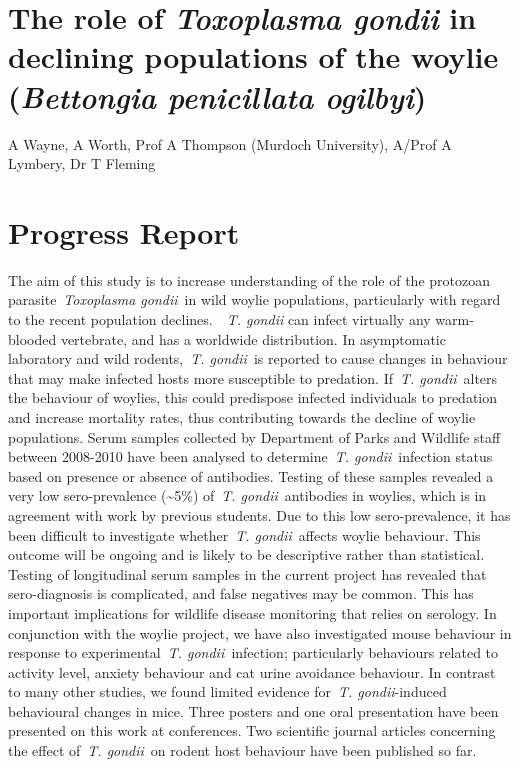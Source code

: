 \documentclass[version=last, 
    paper=a4, %
    10pt, %
    usenames,
    dvipsnames, 
    oneside, %
    headings=openany, %
    DIV=15 %
]{scrbook}
\begin{document}
\section*{The role of \emph{Toxoplasma gondii} in declining populations of the
woylie (\emph{Bettongia penicillata ogilbyi})
}

A Wayne, A Worth, Prof A Thompson (Murdoch University), A/Prof A
Lymbery, Dr T Fleming


\section*{Progress Report}
The aim of this study is to increase understanding of the role of the
protozoan parasite~\emph{Toxoplasma gondii}~in wild woylie populations,
particularly with regard to the recent population declines.~~\emph{T.
gondii} can infect virtually any warm-blooded vertebrate, and has a
worldwide distribution. In asymptomatic laboratory and wild
rodents,~\emph{T. gondii~}is reported to cause changes in behaviour that
may make infected hosts more susceptible to predation. If~\emph{T.
gondii}~alters the behaviour of woylies, this could predispose infected
individuals to predation and increase mortality rates, thus contributing
towards the decline of woylie populations. Serum samples collected by
Department of Parks and Wildlife staff between 2008-2010 have been
analysed to determine~\emph{T. gondii}~infection status based on
presence or absence of antibodies. Testing of these samples revealed a
very low sero-prevalence (\textasciitilde{}5\%) of~\emph{T.
gondii}~antibodies in woylies, which is in agreement with work by
previous students. Due to this low sero-prevalence, it has been
difficult to investigate whether~\emph{T. gondii}~affects woylie
behaviour. This outcome will be ongoing and is likely to be descriptive
rather than statistical. Testing of longitudinal serum samples in the
current project has revealed that sero-diagnosis is complicated, and
false negatives may be common. This has important implications for
wildlife disease monitoring that relies on serology. In conjunction with
the woylie project, we have also investigated mouse behaviour in
response to experimental~\emph{T. gondii~}infection; particularly
behaviours related to activity level, anxiety behaviour and cat urine
avoidance behaviour. In contrast to many other studies, we found limited
evidence for~\emph{T. gondii}-induced behavioural changes in mice. Three
posters and one oral presentation have been presented on this work at
conferences. Two scientific journal articles concerning the effect
of~\emph{T. gondii}~on rodent host behaviour have been published so far.



\end{document}

